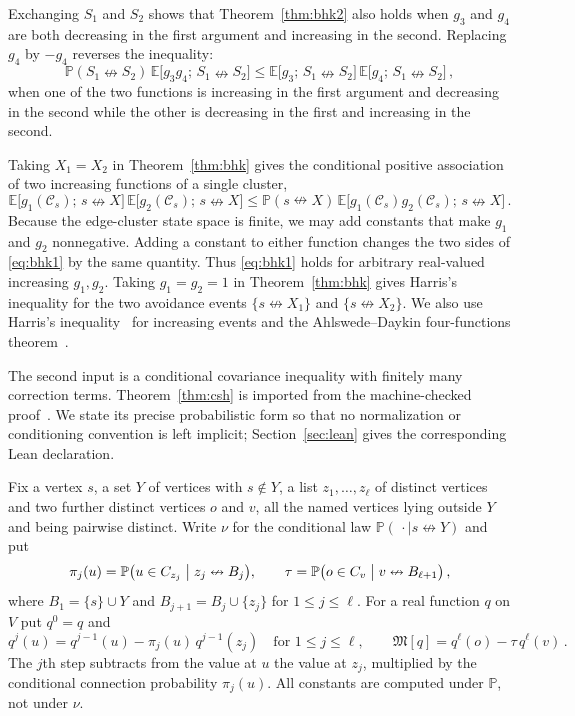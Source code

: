 \documentclass[11pt]{article}
\theoremstyle{definition}
\theoremstyle{remark}
\newcommand{\PP}{\mathbb P}
\newcommand{\EE}{\mathbb E}
\newcommand{\ncon}{\nleftrightarrow}
\newcommand{\eC}{\mathcal C}
\newcommand{\Marg}{\mathfrak M}
\begin{document}
Exchanging $S_1$ and $S_2$ shows that Theorem~\ref{thm:bhk2} also holds when $g_3$ and
$g_4$ are both decreasing in the first argument and increasing in the second. Replacing
$g_4$ by $-g_4$ reverses the inequality:
\begin{equation}\label{eq:bhkneg}
 \PP(S_1\ncon S_2)\,\EE\bigl[g_3g_4;\,S_1\ncon S_2\bigr]\leq
 \EE\bigl[g_3;\,S_1\ncon S_2\bigr]\,\EE\bigl[g_4;\,S_1\ncon S_2\bigr]\,,
\end{equation}
when one of the two functions is increasing in the first argument and decreasing in the
second while the other is decreasing in the first and increasing in the second.

Taking $X_1=X_2$ in Theorem~\ref{thm:bhk} gives the conditional positive association of two
increasing functions of a single cluster,
\begin{equation}\label{eq:bhk1}
 \EE\bigl[g_1(\eC_s);\,s\ncon X\bigr]\,\EE\bigl[g_2(\eC_s);\,s\ncon X\bigr]
\leq \PP(s\ncon X)\,\EE\bigl[g_1(\eC_s)g_2(\eC_s);\,s\ncon X\bigr]\,.
\end{equation}
Because the edge-cluster state space is finite, we may add constants that make $g_1$ and
$g_2$ nonnegative. Adding a constant to either function changes the two sides of
\eqref{eq:bhk1} by the same quantity. Thus \eqref{eq:bhk1} holds for arbitrary real-valued
increasing $g_1,g_2$. Taking $g_1=g_2=1$ in Theorem~\ref{thm:bhk} gives Harris's inequality
for the two avoidance events $\{s\ncon X_1\}$ and $\{s\ncon X_2\}$. We also use Harris's
inequality~\cite{H} for increasing events and the Ahlswede--Daykin four-functions
theorem~\cite{AD}.

The second input is a conditional covariance inequality with finitely many correction
terms. Theorem~\ref{thm:csh} is imported from the machine-checked proof~\cite{Dev}. We
state its precise probabilistic form so that no normalization or conditioning convention
is left implicit; Section~\ref{sec:lean} gives the corresponding Lean declaration.

Fix a vertex $s$, a set $Y$ of vertices with $s\notin Y$, a list $z_1,\dots,z_\ell$ of
distinct vertices and two further distinct vertices $o$ and $v$, all the named vertices
lying outside $Y$ and being pairwise distinct. Write $\nu$ for the conditional law
$\PP(\,\cdot\mid s\ncon Y)$ and put
\begin{equation}\label{eq:constants}
 \pi_j(u)=\PP\bigl(u\in C_{z_j}\bigm|z_j\ncon B_j\bigr),\qquad
 \tau=\PP\bigl(o\in C_v\bigm|v\ncon B_{\ell+1}\bigr)\,,
\end{equation}
where $B_1=\{s\}\cup Y$ and $B_{j+1}=B_j\cup\{z_j\}$ for $1\leq j\leq\ell$. For a real
function $q$ on $V$ put $q^0=q$ and
\begin{equation}\label{eq:levels}
 q^j(u)=q^{j-1}(u)-\pi_j(u)\,q^{j-1}(z_j)\quad\text{for } 1\leq j\leq\ell,\qquad
 \Marg[q]=q^\ell(o)-\tau\,q^\ell(v)\,.
\end{equation}
The $j$th step subtracts from the value at $u$ the value at $z_j$, multiplied by the
conditional connection probability $\pi_j(u)$. All constants are computed under $\PP$,
not under $\nu$.
\end{document}
